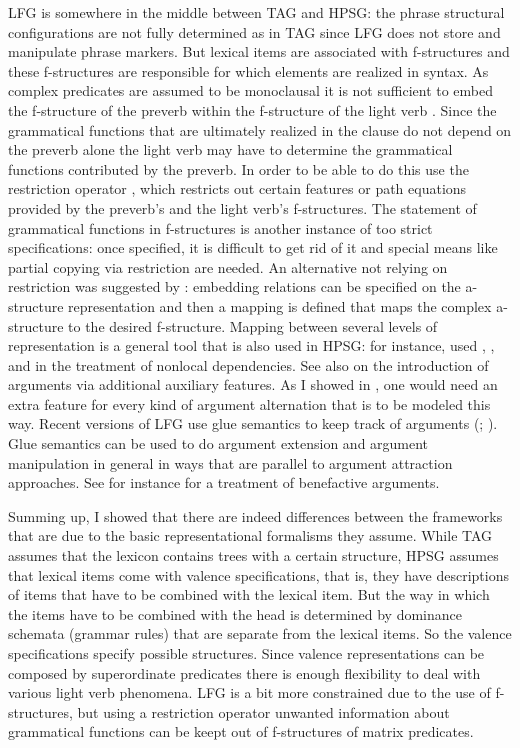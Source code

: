 LFG is somewhere in the middle between TAG and HPSG: the phrase structural configurations are not
fully determined as in TAG since LFG does not store and manipulate phrase markers. But lexical items are
associated with f-structures and these f-structures are responsible for which elements are realized
in syntax. As complex predicates are assumed to be monoclausal it is not sufficient to embed the
f-structure of the preverb within the f-structure of the light verb \citep{BHKM2003a-u}. Since the grammatical functions
that are ultimately realized in the clause do not depend on the preverb alone the light verb may have
to determine the grammatical functions contributed by the preverb. In order to be able to do this \citet{BHKM2003a-u}
use the restriction operator \citep{KW93a-u}, which restricts out certain features or path equations provided by the
preverb's and the light verb's f-structures. The statement of grammatical functions in
f-structures is another instance of too strict specifications: once specified, it is difficult to get rid of it and special means like partial copying via
restriction are needed. 
An alternative not relying on restriction was suggested by \citet{Butt97a}:
embedding relations can be specified on the a-structure representation and then a mapping is defined
that maps the complex a-structure to the desired f-structure. Mapping between several levels of
representation is a general tool that is also used in HPSG: for instance, \citet*{BMS2001a} used
\argst, \deps, and \comps in the treatment of nonlocal dependencies. See also \citet{Koenig99a} on
the introduction of arguments via additional auxiliary features. As I showed in
\citet[Section~7.5.2.2]{MuellerLehrbuch1}, one would need an extra feature for every kind of argument alternation
that is to be modeled this way. Recent versions of LFG use glue semantics to keep track of arguments
(\citealp*{DLS93a-u}; \citealp[Chapter~8]{Dalrymple2001a-u}). Glue semantics can
be used to do argument extension and argument manipulation in general in ways that are parallel to
argument attraction approaches. See for instance  for a treatment of
benefactive arguments. 


Summing up, I showed that there are indeed differences between the frameworks that are due to the
basic representational formalisms they assume. While TAG assumes that the lexicon contains
trees with a certain structure, HPSG assumes that lexical items come with valence specifications,
that is, they have descriptions of items that have to be combined with the lexical item. But the way
in which the items have to be combined with the head is determined by dominance schemata (grammar
rules) that are separate from the lexical items. So the valence specifications specify possible
structures. Since valence
representations can be composed by superordinate predicates there is enough flexibility to deal with
various light verb phenomena. LFG is a bit more constrained due to the use of f-structures, but using
a restriction operator unwanted information about grammatical functions can be keept out of
f-structures of matrix predicates.

\bigskip
{}








